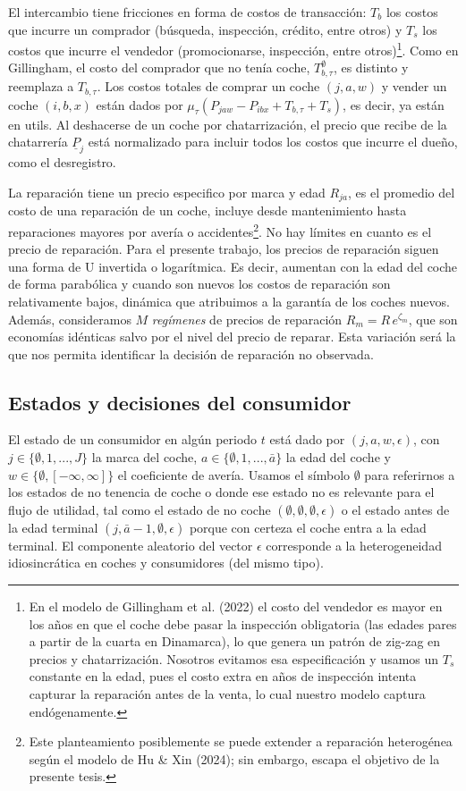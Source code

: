 \documentclass{article}
\begin{document}
El intercambio tiene fricciones en forma de costos de transacción: $T_b$ los costos que incurre un comprador (búsqueda, inspección, crédito, entre otros) y $T_s$ los costos que incurre el vendedor (promocionarse, inspección, entre otros)\footnote{En el modelo de Gillingham et al. (2022) el costo del vendedor es mayor en los años en que el coche debe pasar la inspección obligatoria (las edades pares a partir de la cuarta en Dinamarca), lo que genera un patrón de zig-zag en precios y chatarrización. Nosotros evitamos esa especificación y usamos un $T_s$ constante en la edad, pues el costo extra en años de inspección intenta capturar la reparación antes de la venta, lo cual nuestro modelo captura endógenamente.}. Como en Gillingham, el costo del comprador que no tenía coche, $T^{\emptyset}_{b,\tau}$, es distinto y reemplaza a $T_{b,\tau}$. Los costos totales de comprar un coche $(j,a,w)$ y vender un coche $(i,b,x)$ están dados por $\mu_\tau(P_{jaw}-P_{ibx}+T_{b,\tau}+T_s)$, es decir, ya están en utils. Al deshacerse de un coche por chatarrización, el precio que recibe de la chatarrería $\underline{P}_j$ está normalizado para incluir todos los costos que incurre el dueño, como el desregistro.

La reparación tiene un precio especifico por marca y edad $R_{ja}$, es el promedio del costo de una reparación de un coche, incluye desde mantenimiento hasta reparaciones mayores por avería o accidentes\footnote{Este planteamiento posiblemente se puede extender a reparación heterogénea según el modelo de Hu \& Xin (2024); sin embargo, escapa el objetivo de la presente tesis.}. No hay límites en cuanto es el precio de reparación. Para el presente trabajo, los precios de reparación siguen una forma de U invertida o logarítmica. Es decir, aumentan con la edad del coche de forma parabólica y cuando son nuevos los costos de reparación son relativamente bajos, dinámica que atribuimos a la garantía de los coches nuevos. Además, consideramos $M$ \textit{regímenes} de precios de reparación $R_{m}=R\,e^{\zeta_m}$, que son economías idénticas salvo por el nivel del precio de reparar. Esta variación será la que nos permita identificar la decisión de reparación no observada.



\subsection{Estados y decisiones del consumidor}

El estado de un consumidor en algún periodo $t$ está dado por $(j,a,w,\epsilon)$, con $j\in \{\emptyset,1,...,J \}$ la marca del coche, $a\in\{\emptyset, 1,...,\bar{a}\}$ la edad del coche y $w\in\{\emptyset, [-\infty, \infty]\}$ el coeficiente de avería. Usamos el símbolo $\emptyset$ para referirnos a los estados de no tenencia de coche o donde ese estado no es relevante para el flujo de utilidad, tal como el estado de no coche $(\emptyset,\emptyset,\emptyset,\epsilon)$ o el estado antes de la edad terminal $(j,\bar{a}-1,\emptyset, \epsilon)$ porque con certeza el coche entra a la edad terminal. El componente aleatorio del vector $\epsilon$ corresponde a la heterogeneidad idiosincrática en coches y consumidores (del mismo tipo).
 
\end{document}
